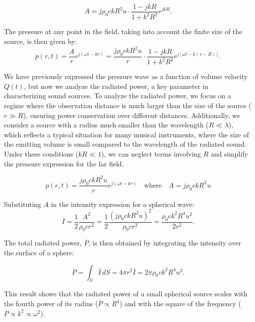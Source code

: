 \documentclass[a4paper]{article}
\begin{document}
\[
A = j \rho_0 c k R^2 u \cdot \frac{1 - j k R}{1 + k^2 R^2} e^{j k R}.
\]



The pressure at any point in the field, taking into account the finite size of the source, is then given by:
\[
p(r, t) = \frac{A}{r} e^{j (\omega t - k r)} = \frac{j \rho_0 c k R^2 u}{r} \cdot \frac{1 - j k R}{1 + k^2 R^2} e^{j [\omega t - k (r - R)]}.
\]




We have previously expressed the pressure wave as a function of volume velocity \( Q(t) \), but now we analyze the radiated power, a key parameter in characterizing sound sources. To analyze the radiated power, we focus on a regime where the observation distance is much larger than the size of the source (\( r \gg R \)), ensuring power conservation over different distances. Additionally, we consider a source with a radius much smaller than the wavelength (\( R \ll \lambda \)), which reflects a typical situation for many musical instruments, where the size of the emitting volume is small compared to the wavelength of the radiated sound. Under these conditions (\( kR \ll 1 \)), we can neglect terms involving \( R \) and simplify the pressure expression for the far field.

\[
p(r, t) = \frac{j \rho_0 c k R^2 u}{r} e^{j(\omega t - kr)} \quad \text{where} \quad A =  j \rho_0 c k R^2 u
\]

Substituting \(A\) in the intensity expression for a spherical wave:
\[
\overline{I} = \frac{1}{2} \frac{A^2}{\rho_0 c r^2} 
 = \frac{1}{2} \frac{\left(j \rho_0 c k R^2 u \right)^2}{\rho_0 c r^2} = \frac{\rho_0 c k^2 R^4 u^2}{2 r^2}.
\]

The total radiated power, \( \overline{P} \), is then obtained by integrating the intensity over the surface of a sphere:

\[
\overline{P} = \int_{S}\overline{I} \, dS = 4\pi r^2 \overline{I} = 2 \pi \rho_0 c k^2 R^4 u^2.
\]

This result shows that the radiated power of a small spherical source scales with the fourth power of its radius (\( \overline{P} \propto R^4 \)) and with the square of the frequency (\( \overline{P} \propto k^2 \propto \omega^2 \)).
\end{document}
